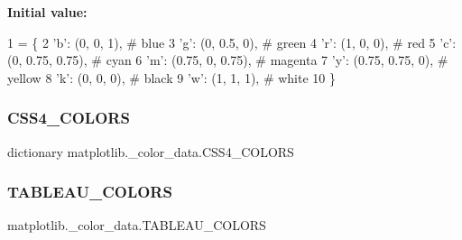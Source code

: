 {\bfseries Initial value\+:}
\begin{DoxyCode}
1 =  \{
2     \textcolor{stringliteral}{'b'}: (0, 0, 1),        \textcolor{comment}{# blue}
3     \textcolor{stringliteral}{'g'}: (0, 0.5, 0),      \textcolor{comment}{# green}
4     \textcolor{stringliteral}{'r': (1, 0, 0),        # red}
5 \textcolor{stringliteral}{    'c'}: (0, 0.75, 0.75),  \textcolor{comment}{# cyan}
6     \textcolor{stringliteral}{'m'}: (0.75, 0, 0.75),  \textcolor{comment}{# magenta}
7     \textcolor{stringliteral}{'y'}: (0.75, 0.75, 0),  \textcolor{comment}{# yellow}
8     \textcolor{stringliteral}{'k'}: (0, 0, 0),        \textcolor{comment}{# black}
9     \textcolor{stringliteral}{'w'}: (1, 1, 1),        \textcolor{comment}{# white}
10 \}
\end{DoxyCode}
\mbox{\label{namespacematplotlib_1_1__color__data_a04a135a6563c6cbfe3bc529506662dca}} 
\subsubsection{\texorpdfstring{C\+S\+S4\+\_\+\+C\+O\+L\+O\+RS}{CSS4\_COLORS}}
{\footnotesize\ttfamily dictionary matplotlib.\+\_\+color\+\_\+data.\+C\+S\+S4\+\_\+\+C\+O\+L\+O\+RS}

\mbox{\label{namespacematplotlib_1_1__color__data_a3583533847f05d3a92ac5075703ebe0e}} 
\subsubsection{\texorpdfstring{T\+A\+B\+L\+E\+A\+U\+\_\+\+C\+O\+L\+O\+RS}{TABLEAU\_COLORS}}
{\footnotesize\ttfamily matplotlib.\+\_\+color\+\_\+data.\+T\+A\+B\+L\+E\+A\+U\+\_\+\+C\+O\+L\+O\+RS}

